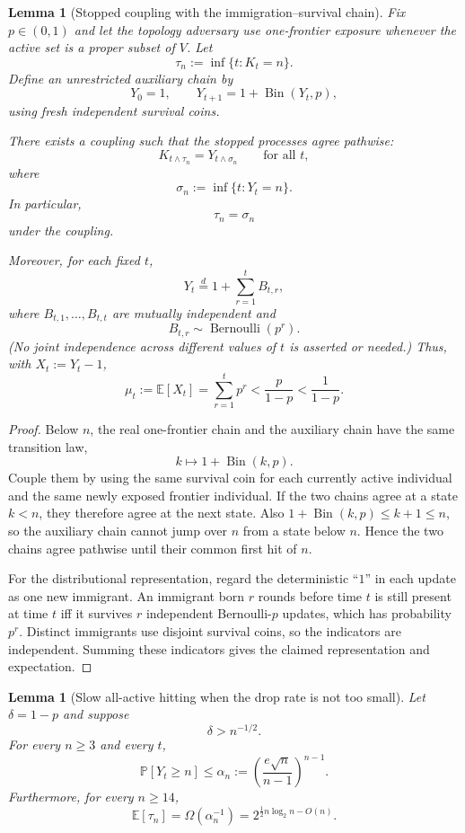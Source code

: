 \documentclass[11pt]{article}
\newtheorem{lemma}[theorem]{Lemma}
\newcommand{\E}{\mathbb{E}}
\newcommand{\Prb}{\mathbb{P}}
\newcommand{\Bin}{\operatorname{Bin}}
\begin{document}
\begin{lemma}[Stopped coupling with the immigration--survival chain]
Fix $p\in(0,1)$ and let the topology adversary use one-frontier exposure
whenever the active set is a proper subset of $V$.  Let
\[
  \tau_n:=\inf\{t:K_t=n\}.
\]
Define an unrestricted auxiliary chain by
\[
  Y_0=1,
  \qquad
  Y_{t+1}=1+\Bin(Y_t,p),
\]
using fresh independent survival coins.

There exists a coupling such that the stopped processes agree pathwise:
\[
  K_{t\wedge\tau_n}
  =
  Y_{t\wedge\sigma_n}
  \qquad\text{for all }t,
\]
where
\[
  \sigma_n:=\inf\{t:Y_t=n\}.
\]
In particular,
\[
  \tau_n=\sigma_n
\]
under the coupling.

Moreover, for each fixed $t$,
\[
  Y_t
  \overset{d}{=}
  1+\sum_{r=1}^{t}B_{t,r},
\]
where $B_{t,1},\ldots,B_{t,t}$ are mutually independent and
\[
  B_{t,r}\sim\operatorname{Bernoulli}(p^r).
\]
(No joint independence across different values of $t$ is asserted or needed.)
Thus, with $X_t:=Y_t-1$,
\[
  \mu_t:=\E[X_t]
  =
  \sum_{r=1}^{t}p^r
  <
  \frac{p}{1-p}
  <
  \frac1{1-p}.
\]
\end{lemma}

\begin{proof}
Below $n$, the real one-frontier chain and the auxiliary chain have the same
transition law,
\[
  k\mapsto 1+\Bin(k,p).
\]
Couple them by using the same survival coin for each currently active
individual and the same newly exposed frontier individual.  If the two chains
agree at a state $k<n$, they therefore agree at the next state.  Also
$1+\Bin(k,p)\le k+1\le n$, so the auxiliary chain cannot jump over $n$ from a
state below $n$.  Hence the two chains agree pathwise until their common first
hit of $n$.

For the distributional representation, regard the deterministic ``$1$'' in
each update as one new immigrant.  An immigrant born $r$ rounds before time
$t$ is still present at time $t$ iff it survives $r$ independent Bernoulli-$p$
updates, which has probability $p^r$.  Distinct immigrants use disjoint
survival coins, so the indicators are independent.  Summing these indicators
gives the claimed representation and expectation.
\end{proof}

\begin{lemma}[Slow all-active hitting when the drop rate is not too small]
Let $\delta=1-p$ and suppose
\[
  \delta>n^{-1/2}.
\]
For every $n\ge3$ and every $t$,
\[
  \Prb[Y_t\ge n]
  \le
  \alpha_n
  :=
  {\left(
    \frac{e\sqrt n}{n-1}
  \right)}^{n-1}.
\]
Furthermore, for every $n\ge14$,
\[
  \E[\tau_n]
  =
  \Omega(\alpha_n^{-1})
  =
  2^{\frac12 n\log_2 n-O(n)}.
\]
\end{lemma}
\end{document}
